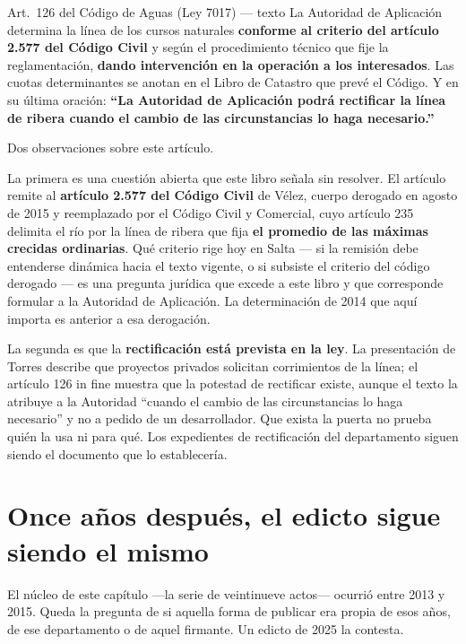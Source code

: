 \begin{ficha}{Art.\ 126 del Código de Aguas (Ley 7017) --- texto}
La Autoridad de Aplicación determina la línea de los cursos naturales \textbf{conforme al criterio del artículo 2.577 del Código Civil} y según el procedimiento técnico que fije la reglamentación, \textbf{dando intervención en la operación a los interesados}. Las cuotas determinantes se anotan en el Libro de Catastro que prevé el Código. Y en su última oración: \textbf{``La Autoridad de Aplicación podrá rectificar la línea de ribera cuando el cambio de las circunstancias lo haga necesario.''}
\end{ficha}

\begin{cautela}
Dos observaciones sobre este artículo.

La primera es una cuestión abierta que este libro señala sin resolver. El artículo remite al \textbf{artículo 2.577 del Código Civil} de Vélez, cuerpo derogado en agosto de 2015 y reemplazado por el Código Civil y Comercial, cuyo artículo 235 delimita el río por la línea de ribera que fija \textbf{el promedio de las máximas crecidas ordinarias}. Qué criterio rige hoy en Salta --- si la remisión debe entenderse dinámica hacia el texto vigente, o si subsiste el criterio del código derogado --- es una pregunta jurídica que excede a este libro y que corresponde formular a la Autoridad de Aplicación. La determinación de 2014 que aquí importa es anterior a esa derogación.

La segunda es que la \textbf{rectificación está prevista en la ley}. La presentación de Torres describe que proyectos privados solicitan corrimientos de la línea; el artículo 126 in fine muestra que la potestad de rectificar existe, aunque el texto la atribuye a la Autoridad ``cuando el cambio de las circunstancias lo haga necesario'' y no a pedido de un desarrollador. Que exista la puerta no prueba quién la usa ni para qué. Los expedientes de rectificación del departamento siguen siendo el documento que lo establecería.
\end{cautela}

\section{Once años después, el edicto sigue siendo el mismo}

El núcleo de este capítulo ---la serie de veintinueve actos--- ocurrió entre 2013 y 2015. Queda la pregunta de si aquella
forma de publicar era propia de esos años, de ese departamento o de aquel firmante. Un edicto de
2025 la contesta.

